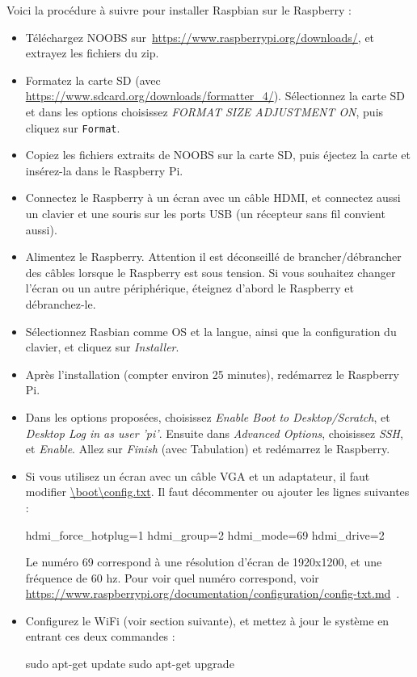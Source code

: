 \documentclass[12pt,a4paper]{report}
\begin{document}
Voici la procédure à suivre pour installer Raspbian sur le Raspberry :

\begin{itemize}
\item Téléchargez NOOBS sur \,\url{https://www.raspberrypi.org/downloads/}, et extrayez les fichiers du zip.

\item Formatez la carte SD (avec \,\url{https://www.sdcard.org/downloads/formatter_4/}). Sélectionnez la carte SD et dans les options choisissez \textit{FORMAT SIZE ADJUSTMENT ON}, puis cliquez sur \verb=Format=.

\item Copiez les fichiers extraits de NOOBS sur la carte SD, puis éjectez la carte et insérez-la dans le Raspberry Pi.

\item Connectez le Raspberry à un écran avec un câble HDMI, et connectez aussi un clavier et une souris sur les ports USB (un récepteur sans fil convient aussi).

\item Alimentez le Raspberry. Attention il est déconseillé de brancher/débrancher des câbles lorsque le Raspberry est sous tension. Si vous souhaitez changer l'écran ou un autre périphérique, éteignez d'abord le Raspberry et débranchez-le.

\item Sélectionnez Rasbian comme OS et la langue, ainsi que la configuration du clavier, et cliquez sur \textit{Installer}.

\item Après l'installation (compter environ 25 minutes), redémarrez le Raspberry Pi.

\item Dans les options proposées, choisissez \textit{Enable Boot to Desktop/Scratch}, et \textit{Desktop Log in as user 'pi'}. Ensuite dans \textit{Advanced Options}, choisissez \textit{SSH}, et \textit{Enable}. Allez sur \textit{Finish} (avec Tabulation) et redémarrez le Raspberry.

\item Si vous utilisez un écran avec un câble VGA et un adaptateur, il faut modifier \url{\boot\config.txt}. Il faut décommenter ou ajouter les lignes suivantes : 
\begin{verbatimtab}[3]
hdmi_force_hotplug=1
hdmi_group=2
hdmi_mode=69
hdmi_drive=2
\end{verbatimtab}
Le numéro 69 correspond à une résolution d'écran de 1920x1200, et une fréquence de 60 hz. Pour voir quel numéro correspond, voir \url{https://www.raspberrypi.org/documentation/configuration/config-txt.md}\, .

\item Configurez le WiFi (voir section suivante), et mettez à jour le système en entrant ces deux commandes :

\bigbreak
\begin{verbatimtab}[3]
sudo apt-get update
sudo apt-get upgrade
\end{verbatimtab}
\bigbreak

\end{itemize}
\end{document}

